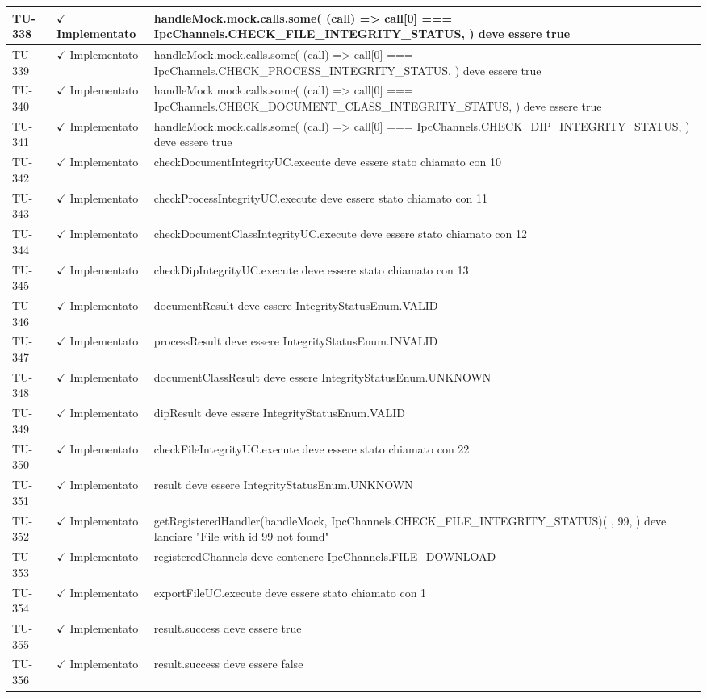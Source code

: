 ﻿\documentclass[a4paper,12pt]{article}
\newcommand{\ok}{\textcolor{green!60!black}{$\checkmark$ Implementato}}
\begin{document}
\begin{longtable}{|p{2cm}|p{3.5cm}|p{9.5cm}|}
\hline
TU-338 & \ok & handleMock.mock.calls.some( (call) => call[0] === IpcChannels.CHECK\_FILE\_INTEGRITY\_STATUS, ) deve essere true \\
\hline
TU-339 & \ok & handleMock.mock.calls.some( (call) => call[0] === IpcChannels.CHECK\_PROCESS\_INTEGRITY\_STATUS, ) deve essere true \\
\hline
TU-340 & \ok & handleMock.mock.calls.some( (call) => call[0] === IpcChannels.CHECK\_DOCUMENT\_CLASS\_INTEGRITY\_STATUS, ) deve essere true \\
\hline
TU-341 & \ok & handleMock.mock.calls.some( (call) => call[0] === IpcChannels.CHECK\_DIP\_INTEGRITY\_STATUS, ) deve essere true \\
\hline
TU-342 & \ok & checkDocumentIntegrityUC.execute deve essere stato chiamato con 10 \\
\hline
TU-343 & \ok & checkProcessIntegrityUC.execute deve essere stato chiamato con 11 \\
\hline
TU-344 & \ok & checkDocumentClassIntegrityUC.execute deve essere stato chiamato con 12 \\
\hline
TU-345 & \ok & checkDipIntegrityUC.execute deve essere stato chiamato con 13 \\
\hline
TU-346 & \ok & documentResult deve essere IntegrityStatusEnum.VALID \\
\hline
TU-347 & \ok & processResult deve essere IntegrityStatusEnum.INVALID \\
\hline
TU-348 & \ok & documentClassResult deve essere IntegrityStatusEnum.UNKNOWN \\
\hline
TU-349 & \ok & dipResult deve essere IntegrityStatusEnum.VALID \\
\hline
TU-350 & \ok & checkFileIntegrityUC.execute deve essere stato chiamato con 22 \\
\hline
TU-351 & \ok & result deve essere IntegrityStatusEnum.UNKNOWN \\
\hline
TU-352 & \ok & getRegisteredHandler(handleMock, IpcChannels.CHECK\_FILE\_INTEGRITY\_STATUS)( {}, 99, ) deve lanciare "File with id 99 not found" \\
\hline
TU-353 & \ok & registeredChannels deve contenere IpcChannels.FILE\_DOWNLOAD \\
\hline
TU-354 & \ok & exportFileUC.execute deve essere stato chiamato con 1 \\
\hline
TU-355 & \ok & result.success deve essere true \\
\hline
TU-356 & \ok & result.success deve essere false \\

\end{longtable}
\end{document}
